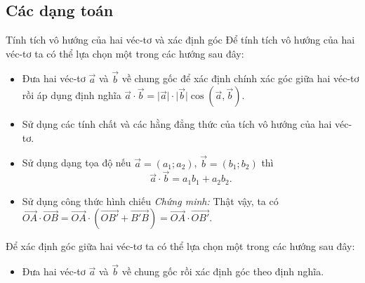 \subsection{Các dạng toán}
\begin{dang}{Tính tích vô hướng của hai véc-tơ và xác định góc}
	Để tính tích vô hướng của hai véc-tơ ta có thể lựa chọn một trong các hướng sau đây:
	\begin{itemize}
		\item Đưa hai véc-tơ $ \overrightarrow{a} $ và $ \overrightarrow{b} $ về chung gốc để xác định chính xác góc giữa hai véc-tơ rồi áp dụng định nghĩa $\overrightarrow{a}\cdot \overrightarrow{b}=\big|\overrightarrow{a}\big|\cdot \big|\overrightarrow{b}\big|\cos\left(\overrightarrow{a},\overrightarrow{b}\right).$
		\item Sử dụng các tính chất và các hằng đẳng thức của tích vô hướng của hai véc-tơ.
		\item Sử dụng dạng tọa độ nếu $\overrightarrow{a}=(a_1;a_2)$, $\overrightarrow{b}=(b_1;b_2)$ thì \[ \overrightarrow{a}\cdot \overrightarrow{b}=a_1b_1+a_2b_2.\]
		\item Sử dụng công thức hình chiếu
		      \textit{Chứng minh:} Thật vậy, ta có  $ \overrightarrow{OA}\cdot \overrightarrow{OB}=\overrightarrow{OA}\cdot \left (\overrightarrow{OB'}+\overrightarrow{B'B}\right )=\overrightarrow{OA}\cdot \overrightarrow{OB'} $.
	\end{itemize}
	Để xác định góc giữa hai véc-tơ ta có thể lựa chọn một trong các hướng sau đây:
	\begin{itemize}
		\item Đưa hai véc-tơ $ \overrightarrow{a} $ và $ \overrightarrow{b} $ về chung gốc rồi xác định góc theo định nghĩa.

\end{itemize}
\end{dang}
